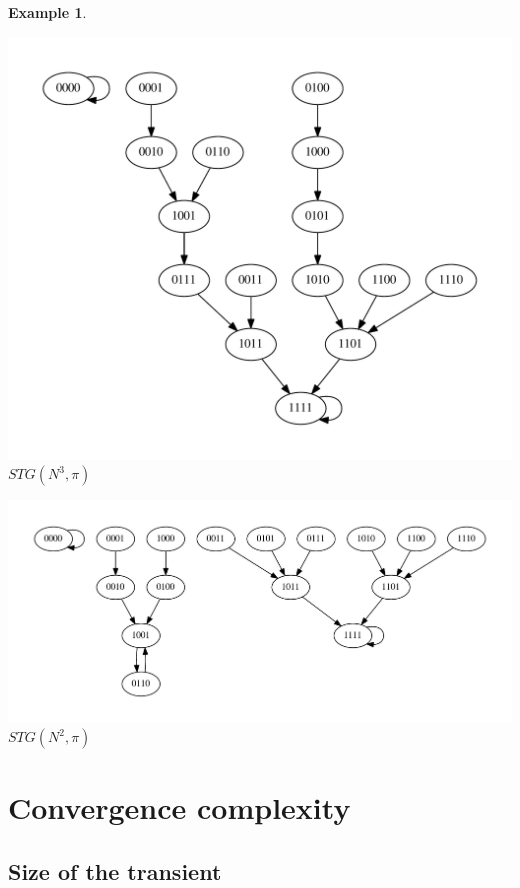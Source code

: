 \documentclass[preprint,12pt]{elsarticle}
\newcommand{\STG}{\textit{STG}}
\newtheorem{exmp}{Example}
\begin{document}
\begin{exmp}
\begin{multicols}{2}
\begin{center}
\includegraphics[scale=0.3]{./figuras/3_1,1,2,2_ej_bueno_1,1,1,1.pdf}
\textit{$\STG(N^3,\pi)$}
\end{center}
\end{multicols}
\begin{center}
\includegraphics[scale=0.3]{./figuras/4_1,1,2,2_ej_bueno_1,1,1,1.pdf}
\textit{$\STG(N^2,\pi)$}
\end{center}
\end{exmp} 

\section{Convergence complexity}\label{sec-filt-conv}

\subsection{Size of the transient}       
\end{document}
